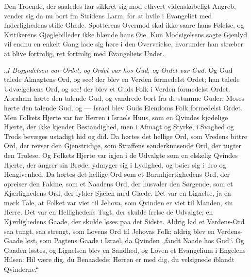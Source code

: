 \documentclass[12pt,a4paper]{book}
\begin{document}
Den Troende, der saaledes har sikkret sig mod ethvert videnskabeligt Angreb,
vender sig da nu bort fra Stridens Larm, for at hvile i Evangeliet med
Inderlighedens stille Glæde. Spotterens Overmod skal ikke saare hans Følelse,
og Kritikerens Gjøglebilleder ikke blænde hans Øie. Kun Modsigelsens sagte
Gjenlyd vil endnu en enkelt Gang lade sig høre i den Overveielse, hvorunder
han stræber at blive fortrolig, ret fortrolig med Evangeliets Under.

„\emph{I Begyndelsen var Ordet, og Ordet var hos Gud, og Ordet var Gud.} Og
Gud talede Almagtens Ord, og see! der blev en Verden formedelst Ordet; han
talede Udvælgelsens Ord, og see! der blev et Guds Folk i Verden formedelst
Ordet.
Abraham hørte den talende Gud, og vandrede bort fra de stumme Guder; Moses
hørte den talende Gud, og --- Israel blev Guds Eiendoms Folk formedelst Ordet.
Men Folkets Hjerte var for Herren i Israels Huus, som en Qvindes kjødelige
Hjerte, der ikke kjender Bestandighed, men i Afmagt og Styrke, i Svaghed og
Trods bevæges ustadigt hid og did. Da hørtes det hellige Ord, som Vredens
bittre Ord, der revser den Gjenstridige, som Straffens sønderknusende Ord, der
tugter den Troløse. Og Folkets Hjerte var igjen i de Udvalgte som en elskelig
Qvindes Hjerte, der angrer sin Brøde, ydmyger sig i Lydighed, og bøier sig i
Tro og Hengivenhed. Da hørtes det hellige Ord som et Barmhjertighedens Ord, der
opreiser den Faldne, som et Naadens Ord, der husvaler den Sørgende, som et
Kjærlighedens Ord, der fylder Sjælen med Glæde. Det var en Lignelse, ja en mørk
Tale, at Folket var viet til Jehova, som Qvinden er viet til Manden, sin Herre.
Det var en Hellighedens Tugt, der skulde frelse de Udvalgte; en Kjærlighedens
Gaade, der skulde løses paa det Sidste. Aldrig lød et Verdens-Ord saa tungt, saa
strengt, som Lovens Ord til Jehovas Folk; aldrig blev en Verdens-Gaade løst, som
Pagtens Gaade i Israel, da Qvinden „fandt Naade hos Gud“. Og Gaaden løstes, og
Lignelsen blev en Sandhed, og Loven et Evangelium i Engelens Hilsen:
{\large Hil være dig, du Benaadede; Herren er med dig, du velsignede iblandt
Qvinderne.“}%
\end{document}
